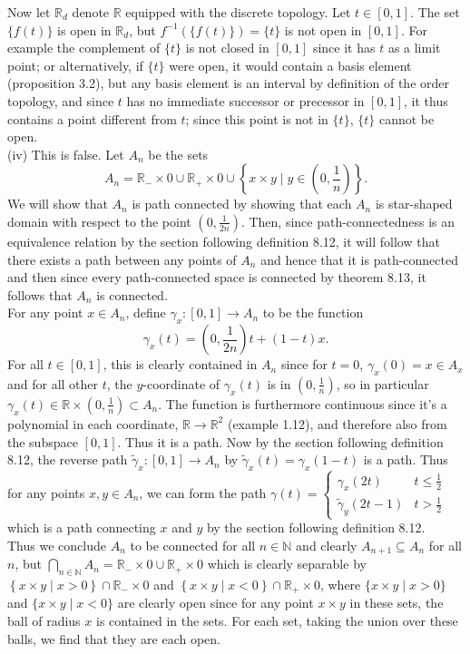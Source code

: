 \documentclass[a4paper]{article}
\begin{document}
Now let $\mathbb{R}_d$ denote $\mathbb{R}$ equipped with the discrete topology.
Let $t \in [0,1]$. The set $\{f(t)\}$ is open in $\mathbb{R}_d$, but
$f^{-1} \left( \{f(t)\} \right) = \{t\}$ is not open in $[0,1]$. 
For example
the complement of $\{t\}$ is not closed in $[0,1]$ since it has $t$ as
a limit point; or alternatively, if $\{t\}$ were open, it would contain a basis
element (proposition 3.2), but any basis element is an interval by definition
of the order topology, and since $t$ has no immediate
successor or precessor in $[0,1]$, it thus contains a point
different from $t$; since this point is not in $\{t\}$, $\{t\}$ cannot be
open.\\
\linebreak
(iv) This is false. Let $A_n$ be the sets
\[
    A_n = \mathbb{R}_- \times 0 \cup \mathbb{R}_+ \times 0 \cup 
    \left\{ x \times y  \mid y \in (0, \frac{1}{n}) \right\}.
\] 
We will show that $A_n$ is path connected by showing that each $A_n$ is
star-shaped domain with respect to the point $(0, \frac{1}{2n})$. Then, since
path-connectedness is an equivalence relation by the section following
definition 8.12, it will follow that there exists
a path between any points of $A_n$ and hence that it is path-connected and then
since every path-connected space is connected by theorem 8.13, it follows that
$A_n$ is connected.\\
For any point $x \in A_n$, define $\gamma_x  \colon [0,1] \to A_n$ to be the function
\[
\gamma_x (t) = \left(0,\frac{1}{2n} \right) t + (1-t) x.
\] 
For all $t \in [0,1]$, this is clearly contained in $A_n$ since for $t=0$,
$\gamma_x (0) = x \in A_x$ and for all other $t$, the $y$-coordinate of
$\gamma_x (t)$ is in $(0,\frac{1}{n})$, so in particular
$\gamma_x (t) \in \mathbb{R} \times \left( 0, \frac{1}{n} \right) 
\subset A_n$. The function is furthermore continuous since it's a polynomial in
each coordinate,
$\mathbb{R} \to \mathbb{R}^2$ (example 1.12), and therefore also from the
subspace $[0,1]$. Thus it is a path. 
Now by the section following definition 8.12, the reverse path
$\tilde{\gamma}_x  \colon [0,1] \to A_n$ by $\tilde{\gamma}_x (t) = \gamma_x
(1-t)$ is a path. Thus for any points $x,y \in A_n$, we can form the path
$\gamma (t) = \begin{cases}
    \gamma_x (2t) & t \le \frac{1}{2}\\
    \tilde{\gamma}_y (2t-1) & t>\frac{1}{2}
\end{cases}$ 
which is a path connecting $x$ and $y$ by the section following definition
8.12.\\
Thus we conclude $A_n$ to be connected for all $n \in \mathbb{N}$ and clearly
$A_{n+1} \subseteq A_n$ for all $n$, but
$\bigcap_{n \in \mathbb{N}} A_n = \mathbb{R}_- \times 0 \cup \mathbb{R}_+
\times 0$
which is clearly separable by $\left\{ x \times y  \mid x >0 \right\} 
\cap \mathbb{R}_- \times 0$ and $\left\{ x \times y  \mid
    x<0 \right\} \cap \mathbb{R}_+ \times 0
    $, where $\{x \times y  \mid x >0\}$ and $\{x \times y  \mid x < 0\}$
    are clearly open since for any point $x \times y$ in these
    sets, the ball of radius $x$ is contained in the sets. For each set, taking the union
    over these balls, we find that they are each open.



    
\end{document}
